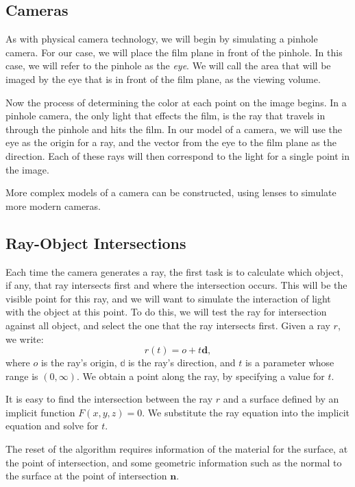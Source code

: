 \documentclass[
]{book}
\begin{document}
\hypertarget{cameras}{%
\subsection{Cameras}\label{cameras}}

As with physical camera technology, we will begin by simulating a pinhole
camera. For our case, we will place the film plane in front of the pinhole. In
this case, we will refer to the pinhole as the \emph{eye}. We will call the area
that will be imaged by the eye that is in front of the film plane, as the
viewing volume.

Now the process of determining the color at each point on the image begins. In
a pinhole camera, the only light that effects the film, is the ray that travels
in through the pinhole and hits the film. In our model of a camera, we will use
the eye as the origin for a ray, and the vector from the eye to the film plane
as the direction. Each of these rays will then correspond to the light for a
single point in the image.

More complex models of a camera can be constructed, using lenses to simulate
more modern cameras.

\hypertarget{ray-object-intersections}{%
\subsection{Ray-Object Intersections}\label{ray-object-intersections}}

Each time the camera generates a ray, the first task is to calculate which
object, if any, that ray intersects first and where the intersection occurs.
This will be the visible point for this ray, and we will want to simulate the
interaction of light with the object at this point. To do this, we will test
the ray for intersection against all object, and select the one that the ray
intersects first. Given a ray \(r\), we write:
\[
r(t)=o+t\mathbf{d},
\]
where \(o\) is the ray's origin, \(\mathbb{d}\) is the ray's direction, and \(t\) is
a parameter whose range is \((0,\infty)\). We obtain a point along the ray, by
specifying a value for \(t\).

It is easy to find the intersection between the ray \(r\) and a surface defined
by an implicit function \(F(x,y,z)=0\). We substitute the ray equation into the
implicit equation and solve for \(t\).

The reset of the algorithm requires information of the material for the
surface, at the point of intersection, and some geometric information such as
the normal to the surface at the point of intersection \(\mathbf{n}\).
\end{document}
